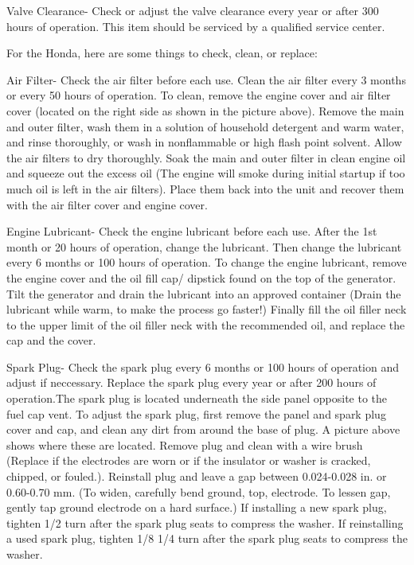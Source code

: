\documentclass[12pt]{../SOP3_beta}
\begin{document}
\NP Valve Clearance- Check or adjust the valve clearance every year or after 300 hours of operation. This item should be serviced by a qualified service center.

\NP For the Honda, here are some things to check, clean, or replace:

\NP Air Filter- Check the air filter before each use. Clean the air filter every 3 months or every 50 hours of operation. To clean, remove the engine cover and air filter cover (located on the right side as shown in the picture above). Remove the main and outer filter, wash them in a solution of household detergent and warm water, and rinse thoroughly, or wash in nonflammable or high flash point solvent. Allow the air filters to dry thoroughly. Soak the main and outer filter in clean engine oil and squeeze out the excess oil (The engine will smoke during initial startup if too much oil is left in the air filters). Place them back into the unit and recover them with the air filter cover and engine cover.

\NP Engine Lubricant- Check the engine lubricant before each use. After the 1st month or 20 hours of operation, change the lubricant. Then change the lubricant every 6 months or 100 hours of operation. To change the engine lubricant, remove the engine cover and the oil fill cap/ dipstick found on the top of the generator. Tilt the generator and drain the lubricant into an approved container (Drain the lubricant while warm, to make the process go faster!) Finally fill the oil filler neck to the upper limit of the oil filler neck with the recommended oil, and replace the cap and the cover.

\NP Spark Plug- Check the spark plug every 6 months or 100 hours of operation and adjust if neccessary. Replace the spark plug every year or after 200 hours of operation.The spark plug is located underneath the side panel opposite to the fuel cap vent. To adjust the spark plug, first remove the panel and spark plug cover and cap, and clean any dirt from around the base of plug. A picture above shows where these are located. Remove plug and clean with a wire brush (Replace if the electrodes are worn or if the insulator or washer is cracked, chipped, or fouled.). Reinstall plug and leave a gap between 0.024-0.028 in. or 0.60-0.70 mm. (To widen, carefully bend ground, top, electrode. To lessen gap, gently tap ground electrode on a hard surface.) If installing a new spark plug, tighten 1/2 turn after the spark plug seats to compress the washer. If reinstalling a used spark plug, tighten 1/8 1/4 turn after the spark plug seats to compress the washer.
\end{document}
